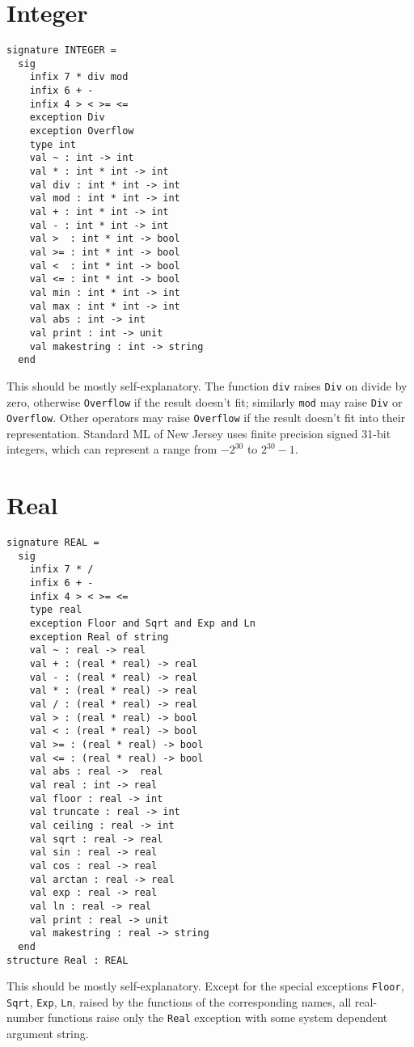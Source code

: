 \section{Integer}
\begin{verbatim}
signature INTEGER = 
  sig
    infix 7 * div mod
    infix 6 + -
    infix 4 > < >= <=
    exception Div
    exception Overflow
    type int
    val ~ : int -> int
    val * : int * int -> int
    val div : int * int -> int
    val mod : int * int -> int
    val + : int * int -> int
    val - : int * int -> int
    val >  : int * int -> bool
    val >= : int * int -> bool
    val <  : int * int -> bool
    val <= : int * int -> bool
    val min : int * int -> int
    val max : int * int -> int
    val abs : int -> int
    val print : int -> unit
    val makestring : int -> string
  end
\end{verbatim}
This should be mostly self-explanatory.
The function \verb"div" raises \verb"Div" on divide by zero,
otherwise \verb"Overflow" if the result doesn't fit;  similarly
\verb"mod" may raise \verb"Div" or \verb"Overflow".  Other operators
may raise \verb"Overflow" if the result doesn't fit into their
representation.
Standard ML of New Jersey uses finite precision signed 31-bit integers,
which can represent a range from $-2^{30}$ to $2^{30}-1$.
\section{Real}
\begin{verbatim}
signature REAL =
  sig
    infix 7 * /
    infix 6 + -
    infix 4 > < >= <=
    type real
    exception Floor and Sqrt and Exp and Ln
    exception Real of string
    val ~ : real -> real 
    val + : (real * real) -> real 
    val - : (real * real) -> real 
    val * : (real * real) -> real 
    val / : (real * real) -> real 
    val > : (real * real) -> bool
    val < : (real * real) -> bool
    val >= : (real * real) -> bool
    val <= : (real * real) -> bool
    val abs : real ->  real
    val real : int -> real
    val floor : real -> int
    val truncate : real -> int
    val ceiling : real -> int
    val sqrt : real -> real
    val sin : real -> real
    val cos : real -> real
    val arctan : real -> real
    val exp : real -> real
    val ln : real -> real
    val print : real -> unit
    val makestring : real -> string
  end
structure Real : REAL
\end{verbatim}

This should be mostly self-explanatory.  Except for the special
exceptions \verb"Floor", \verb"Sqrt", \verb"Exp", \verb"Ln", raised by
the functions of the corresponding names, all real-number functions
raise only the \verb"Real" exception with some system dependent
argument string.

